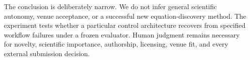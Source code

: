 The conclusion is deliberately narrow. We do not infer general scientific
autonomy, venue acceptance, or a successful new equation-discovery method.
The experiment tests whether a particular control architecture recovers from
specified workflow failures under a frozen evaluator. Human judgment remains
necessary for novelty, scientific importance, authorship, licensing, venue
fit, and every external submission decision.
